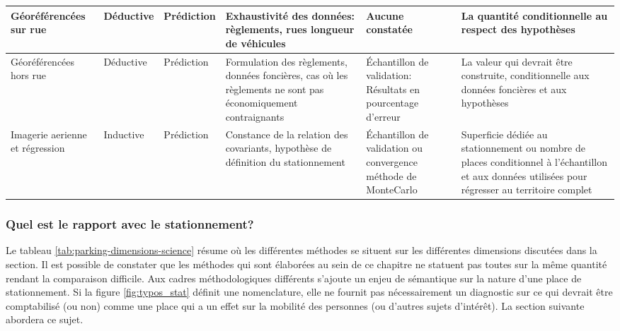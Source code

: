\begin{landscape}
{\begin{longtable}{p{3cm}|p{2cm}p{2cm}p{5cm}p{4cm}p{4cm}}
                    Géoréférencées sur rue & 
                    Déductive & 
                    Prédiction & 
                    Exhaustivité des données: règlements, rues longueur de véhicules & 
                    Aucune constatée  & 
                    La quantité conditionnelle au respect des hypothèses \\\hline
                    
                    Géoréférencées hors rue & 
                    Déductive &
                    Prédiction & 
                    Formulation des règlements, données foncières, cas où les règlements ne sont pas économiquement contraignants & 
                    Échantillon de validation: Résultats en pourcentage d'erreur & 
                    La valeur qui devrait être construite, conditionnelle aux données foncières et aux hypothèses\\\hline

                    Imagerie aerienne et régression & 
                    Inductive & 
                    Prédiction & 
                    Constance de la relation des covariants, hypothèse de définition du stationnement & 
                    Échantillon de validation ou convergence méthode de MonteCarlo & 
                    Superficie dédiée au stationnement ou nombre de places conditionnel à l'échantillon et aux données utilisées pour régresser au territoire complet \\ 
                    
                \end{longtable}
            }
        \end{landscape}
        \subsubsection{Quel est le rapport avec le stationnement?}    
        Le tableau \ref{tab:parking-dimensions-science} résume où les différentes méthodes se situent sur les différentes dimensions discutées dans la section. Il est possible de constater que les méthodes qui sont élaborées au sein de ce chapitre ne statuent pas toutes sur la même quantité rendant la comparaison difficile. Aux cadres méthodologiques différents s'ajoute un enjeu de sémantique sur la nature d'une place de stationnement. Si la figure \ref{fig:typos_stat} définit une nomenclature, elle ne fournit pas nécessairement un diagnostic sur ce qui devrait être comptabilisé (ou non) comme une place qui a un effet sur la mobilité des personnes (ou d'autres sujets d'intérêt). La section suivante abordera ce sujet.
